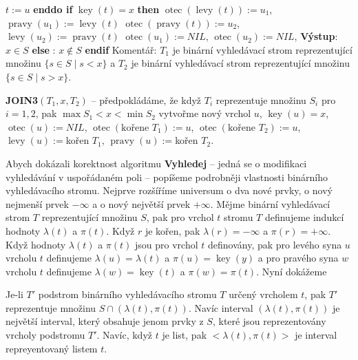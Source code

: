 \documentclass[a4paper,12pt]{article}
\DeclareMathOperator*{\otec}{otec}
\DeclareMathOperator*{\levy}{levy}
\DeclareMathOperator*{\pravy}{pravy}
\DeclareMathOperator*{\key}{key}
\begin{document}
\phantom{---}$t:=u$\newline 
{\bf enddo\newline 
if} $\key(t)=x$ {\bf then}\newline 
\phantom{---}$\otec(\levy(t)):=u_1$, $\pravy(u_1):=\levy(t)$\newline 
\phantom{---}$\otec(\pravy(t)):=u_2$, $\levy(u_2):=\pravy(t)$\newline 
\phantom{---}$\otec(u_1):=NIL$, $\otec(u_2):=NIL$, {\bf Výstup}: $x\in S$\newline 
{\bf else}\newline 
\phantom{---}{\bf Výstup}: $x\notin S$\newline 
{\bf endif\newline }
Komentář: $T_1$ je binární vyhledávací strom reprezentující 
mno\-ži\-nu 
$\{s\in S\mid s<x\}$ a $T_2$ je binární vyhledávací strom 
reprezentující množinu $\{s\in S\mid s>x\}$.

{\bf JOIN3$(T_1,x,T_2)$} -- předpokládáme, že když $
T_i$ reprezentuje 
množinu $S_i$ pro $i=1,2$, pak $\max S_1<x<\min S_2$\newline 
vytvořme nový vrchol $u$, $\key(u)=x$, $\otec(u):=NIL$, \newline 
$\otec(\text{kořene }T_1):=u$, $\otec(\text{kořene }T_2):=u$, \newline 
$\levy(u):=$kořen $T_1$, $\pravy(u):=$kořen $T_2$.

Abych dokázali korektnost algoritmu {\bf Vyhledej} -- 
jedná se o modifikaci vyhledávání v uspořádaném poli --
popíšeme po\-drobněji vlastnosti binárního vyhledávacího 
stromu. Nej\-prve rozšíříme universum o dva nové prvky, o nový 
nejmenší prvek $-\infty$ a o nový největší prvek $+\infty$. 
Mějme binární vyhledávací strom $T$ reprezentující 
množinu $S$, pak pro vrchol $t$ stromu $T$ definujeme indukcí hodnoty $\lambda(t)$ 
a $\pi(t)$. Když $r$ je kořen, pak $\lambda(r)=-\infty$ a $\pi(r)=+\infty$. 
Když hodnoty $\lambda(t)$ a $\pi(t)$ jsou pro vrchol $t$ definovány, pak pro levého syna $u$ vrcholu $t$ definujeme $\lambda(u)=\lambda(t)$ a $\pi(u)=\key(y)$
a pro pravého syna $w$ vrcholu $t$ definujeme $\lambda(w)=\key(t)$ a $\pi(w)=\pi(t)$.
Nyní dokážeme

Je-li $T'$ podstrom binárního vyhledávacího 
stromu $T$ určený vrcholem $t$, pak $T'$ reprezentuje množinu 
$S\cap (\lambda (t),\pi (t))$. Navíc interval $(\lambda (t),\pi 
(t))$ je největší interval, 
který obsahuje jenom prvky z $S$, které jsou reprezentovány 
vrcholy podstromu $T'$. Navíc, když $t$ je list, pak $<\lambda(t),\pi(t)>$ je interval repreyentovaný listem $t$.
\endproclaim
\end{document}
